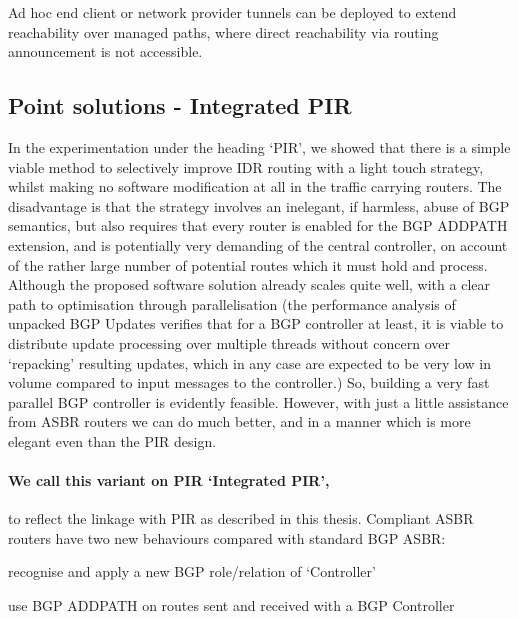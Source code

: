 Ad hoc end client or network provider tunnels can be deployed to extend reachability over managed paths, where direct reachability via routing announcement is not accessible.

 \subsection{Point solutions - Integrated PIR}
 \label{sec:Integrated PIR}
 In the experimentation under the heading `PIR', we showed that there is a simple viable method to selectively improve IDR routing with a light touch strategy, whilst making no software modification at all in the traffic carrying routers.  The disadvantage is that the strategy involves an inelegant, if harmless, abuse of BGP semantics, but also requires that every router is enabled for the BGP ADDPATH extension, and is potentially very demanding of the central controller, on account of the rather large number of potential routes which it must hold and process.  Although the proposed software solution already scales quite well, with a clear path to optimisation through parallelisation (the performance analysis of unpacked BGP Updates verifies that for a BGP controller at least, it is viable to distribute update processing over multiple threads without concern over `repacking' resulting updates, which in any case are expected to be very low in volume compared to input messages to the controller.)  So, building a very fast parallel BGP controller is evidently feasible.  However, with just a little assistance from ASBR routers we can do much better, and in a manner which is more elegant even than the PIR design.

 \paragraph{We call this variant on PIR `Integrated PIR',} to reflect the linkage with PIR as described in this thesis.
 Compliant ASBR routers have two new behaviours compared with standard BGP ASBR:
 \begin{myitemize}
     \item recognise and apply a new BGP role/relation of `Controller'
     \item use BGP ADDPATH on routes sent and received with a BGP Controller
 \end{myitemize}

